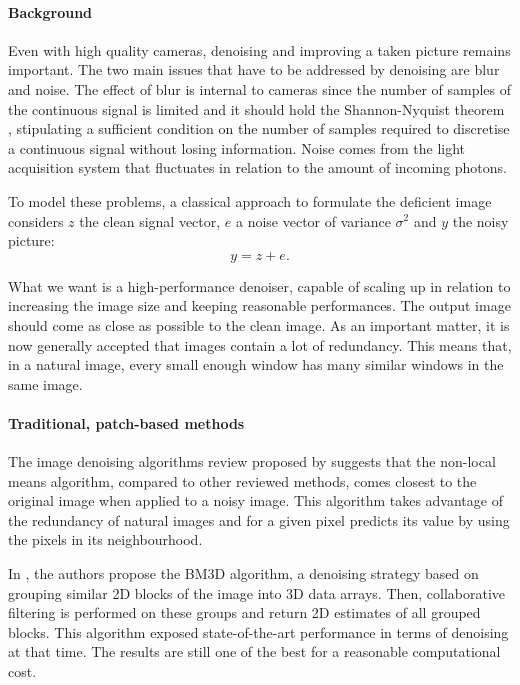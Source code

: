 \paragraph{Background}
Even with high quality cameras, denoising and improving a taken picture remains important.
The two main issues that have to be addressed by denoising are blur and noise.
The effect of blur is internal to cameras since the number of samples of the continuous signal is limited and it should hold the Shannon-Nyquist theorem \cite{buades_review_2005}, stipulating a sufficient condition on the number of samples required to discretise a continuous signal without losing information.
Noise comes from the light acquisition system that fluctuates in relation to the amount of incoming photons.

To model these problems, a classical approach to formulate the deficient image considers \(z\) the clean signal vector, \(e\) a noise vector of variance \(\sigma^2\) and \(y\) the noisy picture:
\[y = z + e.\]

What we want is a high-performance denoiser, capable of scaling up in relation to increasing the image size and keeping reasonable performances.
The output image should come as close as possible to the clean image.
As an important matter, it is now generally accepted that images contain a lot of redundancy.
This means that, in a natural image, every small enough window has many similar windows in the same image.

\paragraph{Traditional, patch-based methods}
The image denoising algorithms review proposed by \cite{buades_review_2005} suggests that the non-local means algorithm, compared to other reviewed methods, comes closest to the original image when applied to a noisy image.
This algorithm takes advantage of the redundancy of natural images and for a given pixel predicts its value by using the pixels in its neighbourhood.

In \cite{dabov_image_2007}, the authors propose the BM3D algorithm, a denoising strategy based on grouping similar 2D blocks of the image into 3D data arrays.
Then, collaborative filtering is performed on these groups and return 2D estimates of all grouped blocks.
This algorithm exposed state-of-the-art performance in terms of denoising at that time.
The results are still one of the best for a reasonable computational cost.

